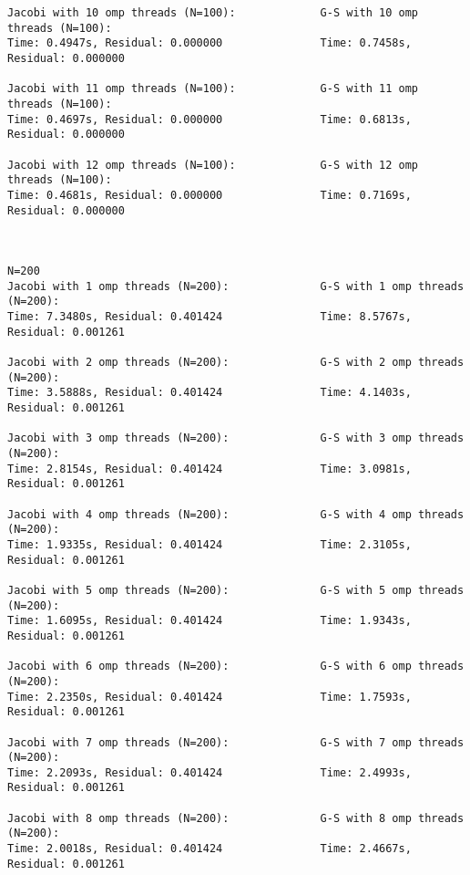 \documentclass{article}
\begin{document}
\begin{lstlisting}
Jacobi with 10 omp threads (N=100):             G-S with 10 omp threads (N=100):
Time: 0.4947s, Residual: 0.000000               Time: 0.7458s, Residual: 0.000000
                        
Jacobi with 11 omp threads (N=100):             G-S with 11 omp threads (N=100):
Time: 0.4697s, Residual: 0.000000               Time: 0.6813s, Residual: 0.000000
                        
Jacobi with 12 omp threads (N=100):             G-S with 12 omp threads (N=100):
Time: 0.4681s, Residual: 0.000000               Time: 0.7169s, Residual: 0.000000
                        
                        
                        
N=200                        
Jacobi with 1 omp threads (N=200):              G-S with 1 omp threads (N=200):
Time: 7.3480s, Residual: 0.401424               Time: 8.5767s, Residual: 0.001261
                        
Jacobi with 2 omp threads (N=200):              G-S with 2 omp threads (N=200):
Time: 3.5888s, Residual: 0.401424               Time: 4.1403s, Residual: 0.001261
                        
Jacobi with 3 omp threads (N=200):              G-S with 3 omp threads (N=200):
Time: 2.8154s, Residual: 0.401424               Time: 3.0981s, Residual: 0.001261
                        
Jacobi with 4 omp threads (N=200):              G-S with 4 omp threads (N=200):
Time: 1.9335s, Residual: 0.401424               Time: 2.3105s, Residual: 0.001261
                        
Jacobi with 5 omp threads (N=200):              G-S with 5 omp threads (N=200):
Time: 1.6095s, Residual: 0.401424               Time: 1.9343s, Residual: 0.001261
                        
Jacobi with 6 omp threads (N=200):              G-S with 6 omp threads (N=200):
Time: 2.2350s, Residual: 0.401424               Time: 1.7593s, Residual: 0.001261
                        
Jacobi with 7 omp threads (N=200):              G-S with 7 omp threads (N=200):
Time: 2.2093s, Residual: 0.401424               Time: 2.4993s, Residual: 0.001261
                        
Jacobi with 8 omp threads (N=200):              G-S with 8 omp threads (N=200):
Time: 2.0018s, Residual: 0.401424               Time: 2.4667s, Residual: 0.001261
                        

\end{lstlisting}
\end{document}
